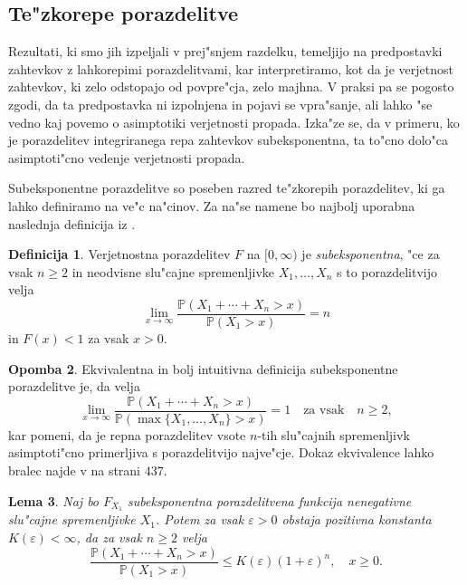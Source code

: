 \documentclass[12pt, a4paper, reqno]{amsart}
\theoremstyle{definition}
\newtheorem{definicija}{Definicija}[section]
\newtheorem{opomba}[definicija]{Opomba}
\theoremstyle{plain}
\newtheorem{lema}[definicija]{Lema}
\newcommand{\Prob}{\mathbb{P}}
\newcommand{\1}{\mathds{1}}
\begin{document}
        
    \subsection{Te"zkorepe porazdelitve}
        Rezultati, ki smo jih izpeljali v prej"snjem razdelku, temeljijo na predpostavki zahtevkov
        z lahkorepimi porazdelitvami, kar interpretiramo, kot da je verjetnost zahtevkov, ki zelo 
        odstopajo od povpre"cja, zelo majhna. V praksi pa se pogosto zgodi, da ta predpostavka ni 
        izpolnjena in pojavi se vpra"sanje, ali lahko "se vedno kaj povemo o asimptotiki verjetnosti 
        propada. Izka"ze se, da v primeru, ko je porazdelitev 
        integriranega repa zahtevkov subeksponentna, ta to"cno dolo"ca asimptoti"cno vedenje verjetnosti 
        propada. 

        Subeksponentne porazdelitve so poseben razred te"zkorepih porazdelitev, ki ga lahko definiramo na 
        ve"c na"cinov. Za na"se namene bo najbolj uporabna naslednja definicija iz \cite{9}.
        \begin{definicija}
            Verjetnostna porazdelitev $F$ na $[0, \infty)$ je \textit{subeksponentna}, "ce za vsak $n\geq2$ in 
            neodvisne slu"cajne spremenljivke $X_1, \dots, X_n$ s to porazdelitvijo velja 
            \begin{equation*}
                \lim_{x\to\infty}\frac{\Prob\left(X_1 + \cdots + X_n > x\right)}{\Prob\left(X_1 > x\right)} = n
            \end{equation*}
            in $F(x) < 1$ za vsak $x > 0$.
            \label{def:subeksponentnaPorazdelitev}
        \end{definicija}

        \begin{opomba}
            Ekvivalentna in bolj intuitivna definicija subeksponentne porazdelitve je, da velja 
            \begin{equation*}
                \lim_{x\to\infty}\frac{\Prob\left(X_1 + \cdots + X_n > x\right)}{\Prob\left(\max\{X_1, \dots, X_n\} > x\right)} = 1 \quad \text{za vsak} \quad n\geq2, 
            \end{equation*}
            kar pomeni, da je repna porazdelitev vsote $n$-tih slu"cajnih spremenljivk asimptoti"cno
            primerljiva s porazdelitvijo najve"cje. Dokaz ekvivalence lahko bralec najde v \cite{9} na strani $437$.
        \end{opomba}

        \begin{lema}
            Naj bo $F_{X_1}$ subeksponentna porazdelitvena funkcija nenegativne slu"cajne spremenljivke 
            $X_1$. Potem za vsak $\varepsilon > 0$ obstaja pozitivna konstanta $K(\varepsilon) < \infty$, 
            da za vsak $n\geq2$ velja 
            \begin{equation*}
                \frac{\Prob(X_1 + \cdots + X_n > x)}{\Prob(X_1 > x)} \leq K(\varepsilon)(1+\varepsilon)^n, \quad x \geq 0. 
            \end{equation*} 
            \label{lema:ocenaSubeksponentnePorazdelitve}
        \end{lema}
\end{document}
